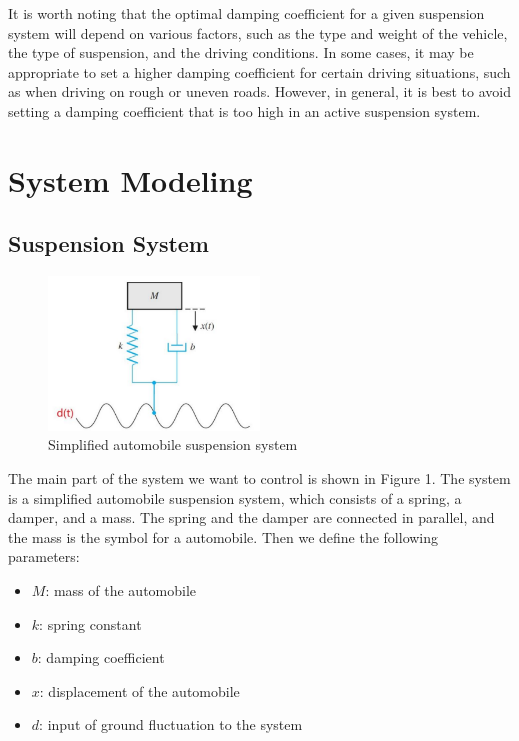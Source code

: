 \documentclass{article}
\begin{document}
It is worth noting that the optimal damping coefficient for a given suspension system will depend on various factors, 
such as the type and weight of the vehicle, the type of suspension, 
and the driving conditions. 
In some cases, 
it may be appropriate to set a higher damping coefficient for certain driving situations, 
such as when driving on rough or uneven roads. 
However, in general, it is best to avoid setting a damping coefficient that is too high in an active suspension system.\\

\section{System Modeling}

\subsection{Suspension System}

\begin{figure}[htbp]
    \centering
    \includegraphics[width=0.5\textwidth]{1.jpg}
    \caption{Simplified automobile suspension system}
\end{figure}

The main part of the system we want to control is shown in Figure 1.
The system is a simplified automobile suspension system, which consists of a spring, a damper, and a mass.
The spring and the damper are connected in parallel, and the mass is the symbol for a automobile.
Then we define the following parameters:\\

\begin{itemize}
    \item $M$: mass of the automobile
    \item $k$: spring constant
    \item $b$: damping coefficient
    \item $x$: displacement of the automobile
    \item $d$: input of ground fluctuation to the system
\end{itemize}
\end{document}
